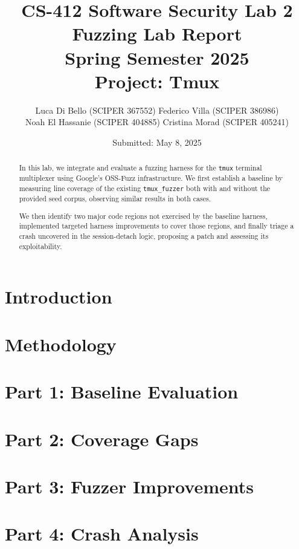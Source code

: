 \documentclass[11pt,a4paper,twocolumn]{article}
\title{%
  CS-412 Software Security Lab 2\\[0.5em]
  \Large Fuzzing Lab Report\\
  Spring Semester 2025\\[0.5em]
  Project: Tmux
}
\author{%
  Luca Di Bello (SCIPER 367552)
  Federico Villa (SCIPER 386986) \\
  Noah El Hassanie (SCIPER 404885)
  Cristina Morad (SCIPER 405241) \\
}
\date{Submitted: May 8, 2025}
\begin{document}
\maketitle

\begin{abstract}
	In this lab, we integrate and evaluate a fuzzing harness for the \texttt{tmux} terminal
	multiplexer using Google’s OSS-Fuzz infrastructure. We first establish a baseline
	by measuring line coverage of the existing \texttt{tmux\_fuzzer} both with and without the
	provided seed corpus, observing similar results in both cases.

	We then identify two major code regions not exercised by the baseline harness, implemented
	targeted harness improvements to cover those regions, and finally triage a crash uncovered
	in the session-detach logic, proposing a patch and assessing its exploitability.
\end{abstract}

\section{Introduction}
\label{sec:introduction}



\section{Methodology}
\label{sec:methodology}



\section{Part 1: Baseline Evaluation}



\section{Part 2: Coverage Gaps}



\section{Part 3: Fuzzer Improvements}



\section{Part 4: Crash Analysis}



\printbibliography
\end{document}
